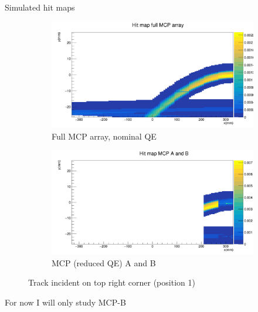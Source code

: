 \documentclass{beamer}
\begin{document}
\begin{frame}{Simulated hit maps}
  \begin{figure}
    \centering
    \vspace{-0.2cm}
    \begin{subfigure}{0.5\textwidth}
      \includegraphics[width = 1.0\textwidth]{Plots/HitMapMCPFull.png}
      \caption{Full MCP array, nominal QE}
    \end{subfigure}%
    \begin{subfigure}{0.5\textwidth}
      \includegraphics[width = 1.0\textwidth]{Plots/HitMapMCPAB_CorrectOrder.png}
      \caption{MCP (reduced QE) A and B}
    \end{subfigure}
    \caption{Track incident on top right corner (position 1)}
  \end{figure}
  \begin{center}
    \Large For now I will only study MCP-B
  \end{center}
\end{frame}
\end{document}
